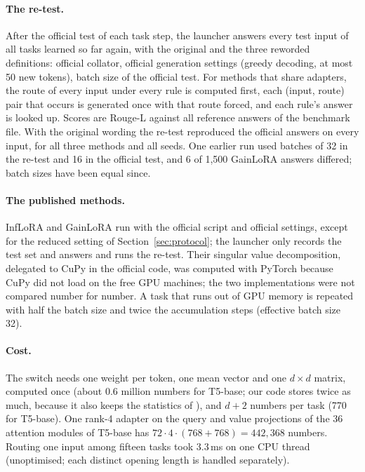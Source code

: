 \paragraph{The re-test.} After the official test of each task step, the launcher answers every test input of all tasks learned so far again, with the original and the three reworded definitions: official collator, official generation settings (greedy decoding, at most 50 new tokens), batch size of the official test. For methods that share adapters, the route of every input under every rule is computed first, each (input, route) pair that occurs is generated once with that route forced, and each rule's answer is looked up. Scores are Rouge-L against all reference answers of the benchmark file. With the original wording the re-test reproduced the official answers on every input, for all three methods and all seeds. One earlier run used batches of 32 in the re-test and 16 in the official test, and 6 of 1{,}500 GainLoRA answers differed; batch sizes have been equal since.

\paragraph{The published methods.} InfLoRA and GainLoRA run with the official script and official settings, except for the reduced setting of Section~\ref{sec:protocol}; the launcher only records the test set and answers and runs the re-test. Their singular value decomposition, delegated to CuPy in the official code, was computed with PyTorch because CuPy did not load on the free GPU machines; the two implementations were not compared number for number. A task that runs out of GPU memory is repeated with half the batch size and twice the accumulation steps (effective batch size 32).

\paragraph{Cost.} The switch needs one weight per token, one mean vector and one $d \times d$ matrix, computed once (about 0.6 million numbers for T5-base; our code stores twice as much, because it also keeps the statistics of \centre{}), and $d + 2$ numbers per task (770 for T5-base). One rank-4 adapter on the query and value projections of the 36 attention modules of T5-base has $72 \cdot 4 \cdot (768 + 768) = 442{,}368$ numbers. Routing one input among fifteen tasks took 3.3\,ms on one CPU thread (unoptimised; each distinct opening length is handled separately).

